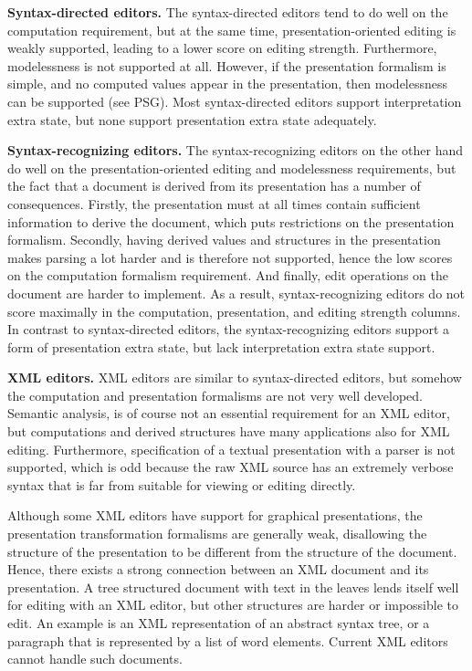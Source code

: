 {\bf Syntax-directed editors.} The syntax-directed editors tend to do well on the computation requirement, but at the same time, presentation-oriented editing is weakly supported, leading to a lower score on editing strength. Furthermore, modelessness is not supported at all. However, if the presentation formalism is simple, and no computed values appear in the presentation, then modelessness can be supported (see PSG). Most syntax-directed editors support interpretation extra state, but none support presentation extra state adequately.

{\bf Syntax-recognizing editors.} The syntax-recognizing editors on the other hand do well on the presentation-oriented editing and modelessness requirements, but the fact that a document is derived from its presentation has a number of consequences. Firstly, the presentation must at all times contain sufficient information to derive the document, which puts restrictions on the presentation formalism. Secondly, having derived values and structures in the presentation makes parsing a lot harder and is therefore not supported, hence the low scores on the computation formalism requirement. And finally, edit operations on the document are harder to implement. As a result, syntax-recognizing editors do not score maximally in the computation, presentation, and editing strength columns. In contrast to syntax-directed editors, the syntax-recognizing editors support a form of presentation extra state, but lack interpretation extra state support.

{\bf XML editors.} XML editors are similar to syntax-directed editors, but somehow the computation and presentation formalisms are not very well developed. Semantic analysis, is of course not an essential requirement for an XML editor, but computations and derived structures have many applications also for XML editing. Furthermore, specification of a textual presentation with a parser is not supported, which is odd because the raw XML source has an extremely verbose syntax that is far from suitable for viewing or editing directly.

Although some XML editors have support for graphical presentations, the presentation transformation formalisms are generally weak, disallowing the structure of the presentation to be different from the structure of the document. Hence, there exists a strong connection between an XML document and its presentation. A tree structured document with text in the leaves lends itself well for editing with an XML editor, but other structures are harder or impossible to edit. An example is an XML representation of an abstract syntax tree, or a paragraph that is represented by a list of word elements. Current XML editors cannot handle such documents.


